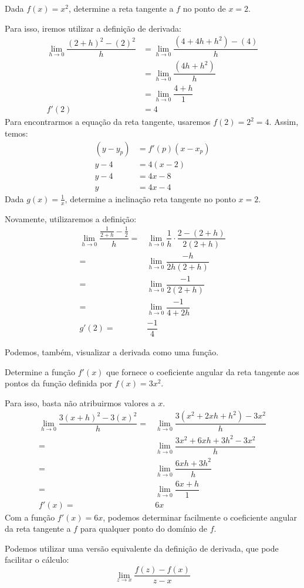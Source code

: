\begin{exemplo}
Dada $f(x)=x^2$, determine a reta tangente a $f$ no ponto de $x=2$. \par 
Para isso, iremos utilizar a definição de derivada:
\begin{align*}
\lim_{h\rightarrow0}\dfrac{(2+h)^2-(2)^2}{h} &= \lim_{h\rightarrow0}\dfrac{(4+4h+h^2)-(4)}{h} \\
&= \lim_{h\rightarrow0}\dfrac{(4h+h^2)}{h} \\
&= \lim_{h\rightarrow0}\dfrac{4+h}{1} \\
f'(2)&= 4
\end{align*}
Para encontrarmos a equação da reta tangente, usaremos $f(2)=2^2=4$. Assim, temos:
\begin{align*}
(y-y_p)&=f'(p)(x-x_p) \\
y-4&=4(x-2) \\
y-4 &=4x-8 \\
y &= 4x-4
\end{align*}
Dada $g(x)=\frac{1}{x}$, determine a inclinação reta tangente no ponto $x=2$. \par 
Novamente, utilizaremos a definição:
\begin{align*}
\lim_{h\rightarrow0}\dfrac{\frac{1}{2+h}-\frac{1}{2}}{h}=&\lim_{h\rightarrow0}\dfrac{1}{h}\cdot\dfrac{2-(2+h)}{2(2+h)} \\
=&\lim_{h\rightarrow0}\dfrac{-h}{2h(2+h)} \\
=&\lim_{h\rightarrow0}\dfrac{-1}{2(2+h)} \\
=&\lim_{h\rightarrow0}\dfrac{-1}{4+2h} \\
g'(2)=&\dfrac{-1}{4}
\end{align*}
\end{exemplo} \par 
Podemos, também, visualizar a derivada como uma função.
\begin{exemplo}
Determine a função $f'(x)$ que fornece o coeficiente angular da reta tangente aos pontos da função definida por $f(x)=3x^2$. \par
Para isso, basta não atribuirmos valores a $x$.
\begin{align*}
\lim_{h\rightarrow0}\dfrac{3(x+h)^2-3(x)^2}{h}=&\lim_{h\rightarrow0}\dfrac{3(x^2+2xh+h^2)-3x^2}{h} \\
=&\lim_{h\rightarrow0}\dfrac{{3x^2}+6xh+3h^2-{3x^2}}{h} \\
=&\lim_{h\rightarrow0}\dfrac{6xh+3h^2}{h} \\
=&\lim_{h\rightarrow0}\dfrac{6x+h}{1} \\
f'(x)=&6x
\end{align*}
Com a função $f'(x)=6x$, podemos determinar facilmente o coeficiente angular da reta tangente a $f$ para qualquer ponto do domínio de $f$.
\end{exemplo} \par 
Podemos utilizar uma versão equivalente da definição de derivada, que pode facilitar o cálculo:
\[\lim_{z\rightarrow x}\dfrac{f(z)-f(x)}{z-x}\]

